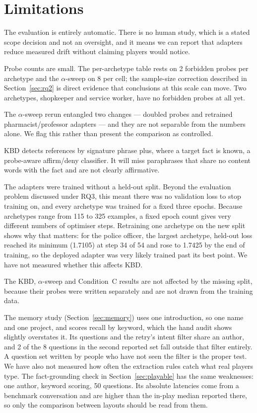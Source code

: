 \documentclass[conference]{IEEEtran}
\begin{document}
\section{Limitations}

The evaluation is entirely automatic. There is no human study, which is a
stated scope decision and not an oversight, and it means we can report that
adapters reduce measured drift without claiming players would notice.

Probe counts are small. The per-archetype table rests on 2 forbidden probes per
archetype and the $\alpha$-sweep on 8 per cell; the sample-size correction
described in Section~\ref{sec:rq2} is direct evidence that conclusions at this
scale can move. Two archetypes, shopkeeper and service worker, have no forbidden probes at
all yet.

The $\alpha$-sweep rerun entangled two changes --- doubled probes and retrained
pharmacist/professor adapters --- and they are not separable from the numbers
alone. We flag this rather than present the comparison as controlled.

KBD detects references by signature phrase plus, where a target fact is known, a
probe-aware affirm/deny classifier. It will miss paraphrases that share no
content words with the fact and are not clearly affirmative.

The adapters were trained without a held-out split. Beyond the evaluation
problem discussed under RQ3, this meant there was no validation loss to stop
training on, and every archetype was trained for a fixed three epochs. Because
archetypes range from 115 to 325 examples, a fixed epoch count gives very
different numbers of optimiser steps. Retraining one archetype on the new
split shows why that matters: for the police officer, the largest archetype,
held-out loss reached its minimum (1.7105) at step 34 of 54 and rose to 1.7425
by the end of training, so the deployed adapter was very likely trained past
its best point. We have not measured whether this affects KBD.

The KBD, $\alpha$-sweep and Condition~C results are not affected by the
missing split, because their probes were written separately and are not drawn
from the training data.

The memory study (Section~\ref{sec:memory}) uses one introduction, so one name
and one project, and scores recall by keyword, which the hand audit shows
slightly overstates it. Its questions and the retry's intent filter share an
author, and 2 of the 8 questions in the second reported set fall outside that
filter entirely. A question set written by people who have not seen the filter
is the proper test. We have also not measured how often the extraction rules
catch what real players type. The fact-grounding check in
Section~\ref{sec:playable} has the same weaknesses: one author, keyword
scoring, 50 questions. Its absolute latencies come from a benchmark
conversation and are higher than the in-play median reported there, so
only the comparison between layouts should be read from them.
\end{document}
